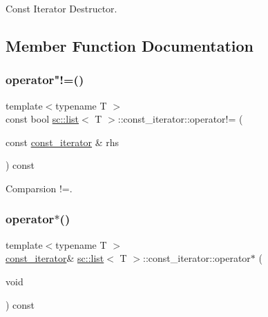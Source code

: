 Const Iterator Destructor. 



\subsection{Member Function Documentation}
\mbox{\label{classsc_1_1list_1_1const__iterator_a4a3b035ef873926e6920da7e642b9907}} 
\subsubsection{\texorpdfstring{operator"!=()}{operator!=()}}
{\footnotesize\ttfamily template$<$typename T $>$ \\
const bool \hyperlink{classsc_1_1list}{sc\+::list}$<$ T $>$\+::const\+\_\+iterator\+::operator!= (\begin{DoxyParamCaption}\item[{const \hyperlink{classsc_1_1list_1_1const__iterator}{const\+\_\+iterator} \&}]{rhs }\end{DoxyParamCaption}) const\hspace{0.3cm}{\ttfamily [inline]}}



Comparsion !=. 

\mbox{\label{classsc_1_1list_1_1const__iterator_a170e1fec1338708e689c1463f7cf0937}} 
\subsubsection{\texorpdfstring{operator$\ast$()}{operator*()}\hspace{0.1cm}{\footnotesize\ttfamily [1/2]}}
{\footnotesize\ttfamily template$<$typename T $>$ \\
\hyperlink{classsc_1_1list_1_1const__iterator}{const\+\_\+iterator}\& \hyperlink{classsc_1_1list}{sc\+::list}$<$ T $>$\+::const\+\_\+iterator\+::operator$\ast$ (\begin{DoxyParamCaption}\item[{void}]{ }\end{DoxyParamCaption}) const\hspace{0.3cm}{\ttfamily [inline]}}



